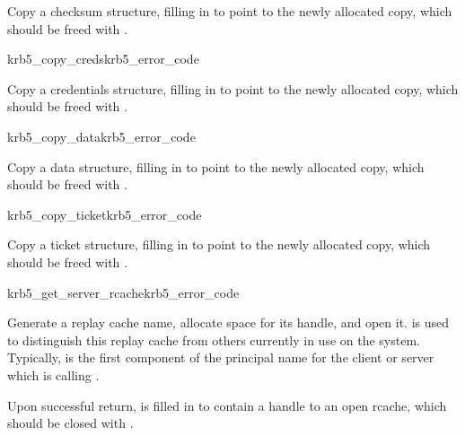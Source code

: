 Copy a checksum structure, filling in  to point to
the newly allocated copy, which should be freed with
.

\begin{funcdecl}{krb5_copy_creds}{krb5_error_code}{\funcinout}
\funcin
{}
\funcout
{}
\end{funcdecl}

Copy a credentials structure, filling in  to point
to the newly allocated copy, which should be freed with
.

\begin{funcdecl}{krb5_copy_data}{krb5_error_code}{\funcinout}
\funcin
{}
\funcout
{}
\end{funcdecl}

Copy a data structure, filling in  to point to the
newly allocated copy, which should be freed with .

\begin{funcdecl}{krb5_copy_ticket}{krb5_error_code}{\funcinout}
\funcin
{}
\funcout
{}
\end{funcdecl}

Copy a ticket structure, filling in  to point to
the newly allocated copy, which should be freed with
.


\begin{funcdecl}{krb5_get_server_rcache}{krb5_error_code}{\funcinout}
\funcin
{}
\funcout
{}
\end{funcdecl}

Generate a replay cache name, allocate space for its handle, and open
it.   is used to distinguish this replay cache from
others currently in use on the system.  Typically, 
is the first component of the principal name for the client or server
which is calling .

Upon successful return,  is filled in to contain a
handle to an open rcache, which should be closed with
.



